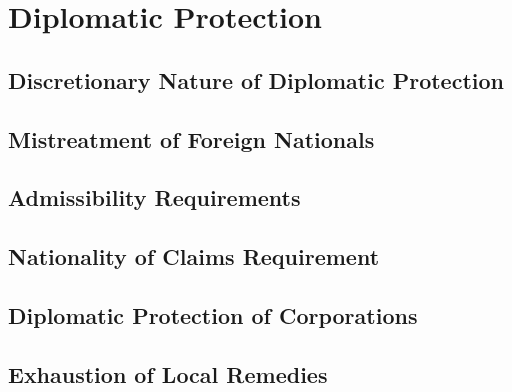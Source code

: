 \section{Diplomatic Protection}
\subsection{Discretionary Nature of Diplomatic Protection}

\subsection{Mistreatment of Foreign Nationals}

\subsection{Admissibility Requirements}

\subsection{Nationality of Claims Requirement}

\subsection{Diplomatic Protection of Corporations}

\subsection{Exhaustion of Local Remedies}
